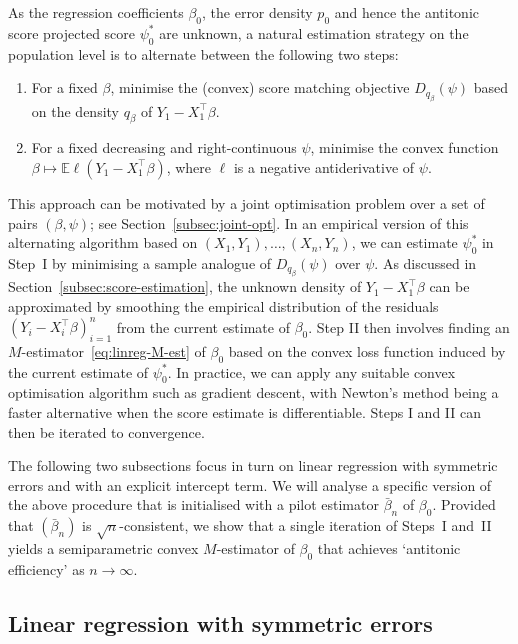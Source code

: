 \documentclass[a4paper]{article}
\newcommand{\E}{\mathbb{E}}
\theoremstyle{definition}
\begin{document}
As the regression coefficients $\beta_0$, the error density $p_0$ and hence the antitonic score projected score $\psi_0^*$ are unknown, a natural estimation strategy on the population level is to alternate between the following two steps:
\begin{enumerate}[label=\Roman*.]
\item For a fixed $\beta$, minimise the (convex) score matching objective $D_{q_\beta}(\psi)$ based on the density $q_\beta$ of $Y_1 - X_1^\top\beta$.
\item For a fixed decreasing and right-continuous $\psi$, minimise the convex function $\beta \mapsto \E\ell(Y_1 - X_1^\top \beta)$, where $\ell$ is a negative antiderivative of $\psi$.  
\end{enumerate}
This approach can be motivated by a joint optimisation problem over a set of pairs $(\beta,\psi)$; see Section~\ref{subsec:joint-opt}. In an empirical version of this alternating algorithm based on $(X_1,Y_1),\dotsc,(X_n,Y_n)$, we can estimate $\psi_0^*$ in Step~I by minimising a sample analogue of $D_{q_\beta}(\psi)$ over $\psi$. As discussed in Section~\ref{subsec:score-estimation}, the unknown density of $Y_1 - X_1^\top\beta$ can be approximated by smoothing the empirical distribution of the residuals $(Y_i - X_i^\top\beta)_{i=1}^n$ from the current estimate of $\beta_0$. Step II then involves finding an $M$-estimator~\eqref{eq:linreg-M-est} of $\beta_0$ based on the convex loss function induced by the current estimate of $\psi_0^*$. In practice, we can apply any suitable convex optimisation algorithm such as gradient descent, with Newton's method being a faster alternative when the score estimate is differentiable. Steps I and II can then be iterated to convergence.

The following two subsections focus in turn on linear regression with symmetric errors and with an explicit intercept term. We will analyse a specific version of the above procedure that is initialised with a pilot estimator $\bar{\beta}_n$ of $\beta_0$. Provided that $(\bar{\beta}_n)$ is $\sqrt{n}$-consistent, we show that a single iteration of Steps~I and~II yields a semiparametric convex $M$-estimator of $\beta_0$ that achieves `antitonic efficiency' as $n \to \infty$.

\subsection{Linear regression with symmetric errors}
\label{subsec:linreg-sym}
\end{document}
